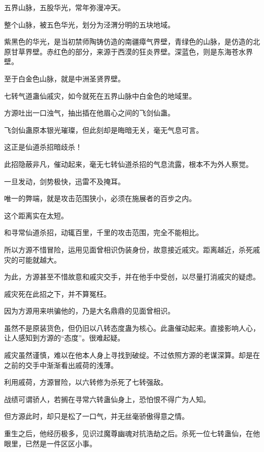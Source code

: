 
\begin{this_body}

五界山脉，五股华光，常年弥漫冲天。

整个山脉，被五色华光，划分为泾渭分明的五块地域。

紫黑色的华光，是当初禁师陶铸仿造的南疆瘴气界壁，青绿色的山脉，是仿造的北原甘草界壁。赤红色的部分，来源于西漠的狂炎界壁。深蓝色，则是东海苍水界壁。

至于白金色山脉，就是中洲圣贤界壁。

七转气道蛊仙戚灾，如今就死在五界山脉中白金色的地域里。

方源吐出一口浊气，抽出插在他眉心之间的飞剑仙蛊。

飞剑仙蛊原本银光璀璨，但此刻却是晦暗无关，毫无气息可言。

这正是仙道杀招暗歧杀！

此招隐蔽非凡，催动起来，毫无七转仙道杀招的气息流露，根本不为外人察觉。

一旦发动，剑势极快，迅雷不及掩耳。

唯一的弊端，就是攻击范围狭小，必须在施展者的百步之内。

这个距离实在太短。

和寻常仙道杀招，动辄百里，千里的攻击范围，完全不能相比。

所以方源不惜冒险，运用见面曾相识伪装身份，故意接近戚灾。距离越近，杀死戚灾的可能就越大。

为此，方源甚至不惜故意和戚灾交手，并在他手中受创，以尽量打消戚灾的疑虑。

戚灾死在此招之下，并不算冤枉。

因为方源用来哄骗他的，乃是大名鼎鼎的见面曾相识。

虽然不是原装货色，但仍旧以八转态度蛊为核心。此蛊催动起来。直接影响人心，让人感知到方源的“态度”。很难起疑。

戚灾虽然谨慎，难以在他本人身上寻找到破绽。不过依照方源的老谋深算。却是在之前的交手中渐渐看出戚荷的浅薄。

利用戚荷，方源冒险，以六转修为杀死了七转强敌。

战绩可谓骄人，若搁在寻常六转蛊仙身上，恐怕恨不得广为人知。

但方源此时，却只是松了一口气，并无丝毫骄傲得意之情。

重生之后，他经历极多，见识过魔尊幽魂对抗浩劫之后。杀死一位七转蛊仙，在他眼里，已然是一件区区小事。


\end{this_body}
